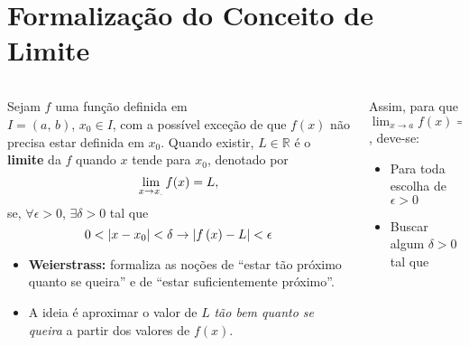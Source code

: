 \section{Formalização do Conceito de Limite}

\begin{frame}
  \begin{columns}[onlytextwidth]
    \begin{column}{0.49\textwidth}\vspace{-0.5cm}\small
      \begin{definition}[Limite]
        Sejam $f$ uma função definida em \\$I=(a,\,b)$, $x_{0}\in I$, com a possível exceção de que $f(x)$ não precisa estar definida em $x_{0}$. Quando existir, $L\in\mathbb{R}$ é o \textbf{limite} da $f$ quando $x$ tende para $x_{0}$, denotado por\vspace*{-0.2cm}
        \begin{equation*}
          \lim_{x\to x_{.}}{f(x)}=L,\vspace*{-0.2cm}
        \end{equation*}
        se, $\forall\epsilon>0$, $\exists\delta>0$ tal que\vspace*{-0.2cm}
        \begin{equation*}
          0<\left|x-x_{0}\right|<\delta \to \left|f\left(x\right)-L\right|<\epsilon\vspace*{-0.2cm}
        \end{equation*}
      \end{definition}
      \begin{itemize}\small
        \item \textbf{Weierstrass:} formaliza as noções de ``estar tão próximo quanto se queira'' e de ``estar suficientemente próximo''.
        \item A ideia é aproximar o valor de $L$ \emph{tão bem quanto se queira} a partir dos valores de $f(x)$.
      \end{itemize}
    \end{column}
    \begin{column}{0.49\textwidth}\small
      Assim, para que $\displaystyle\lim_{x\to a}f(x) = L$, deve-se:
      \begin{itemize}
        \item Para toda escolha de $\epsilon > 0$\vspace{-0.1cm}
        \item Buscar algum $\delta > 0$ tal que\vspace{-0.1cm}

\end{itemize}
\end{column}
\end{columns}
\end{frame}

